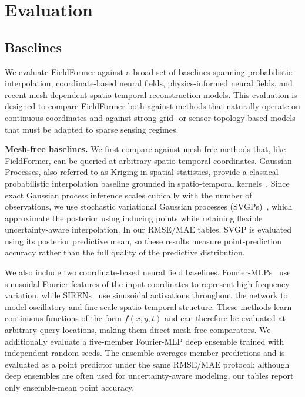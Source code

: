 \section{Evaluation}
\label{sec:evaluation}

\subsection{Baselines}
\label{sec:baselines}

We evaluate FieldFormer against a broad set of baselines spanning probabilistic interpolation, coordinate-based neural fields, physics-informed neural fields, and recent mesh-dependent spatio-temporal reconstruction models. This evaluation is designed to compare FieldFormer both against methods that naturally operate on continuous coordinates and against strong grid- or sensor-topology-based models that must be adapted to sparse sensing regimes.

\noindent\textbf{Mesh-free baselines.}
We first compare against mesh-free methods that, like FieldFormer, can be queried at arbitrary spatio-temporal coordinates. Gaussian Processes, also referred to as Kriging in spatial statistics, provide a classical probabilistic interpolation baseline grounded in spatio-temporal kernels~\citep{cressie1990origins}. Since exact Gaussian process inference scales cubically with the number of observations, we use stochastic variational Gaussian processes (SVGPs)~\citep{hensman2013gaussian}, which approximate the posterior using inducing points while retaining flexible uncertainty-aware interpolation. In our RMSE/MAE tables, SVGP is evaluated using its posterior predictive mean, so these results measure point-prediction accuracy rather than the full quality of the predictive distribution.

We also include two coordinate-based neural field baselines. Fourier-MLPs~\citep{tancik2020fourier} use sinusoidal Fourier features of the input coordinates to represent high-frequency variation, while SIRENs~\citep{sitzmann2020implicit} use sinusoidal activations throughout the network to model oscillatory and fine-scale spatio-temporal structure. These methods learn continuous functions of the form $f(x,y,t)$ and can therefore be evaluated at arbitrary query locations, making them direct mesh-free comparators. We additionally evaluate a five-member Fourier-MLP deep ensemble trained with independent random seeds. The ensemble averages member predictions and is evaluated as a point predictor under the same RMSE/MAE protocol; although deep ensembles are often used for uncertainty-aware modeling, our tables report only ensemble-mean point accuracy.

